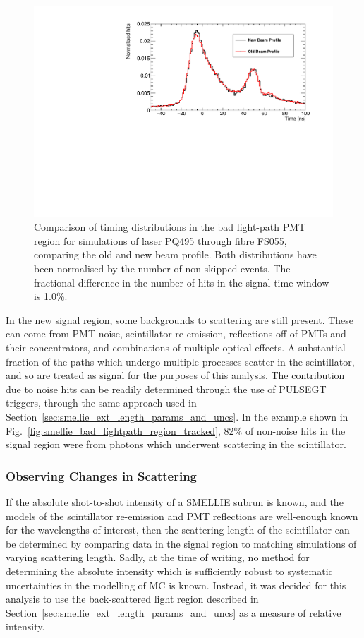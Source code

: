\begin{figure}
    \centering
    \includegraphics[width=\textwidth]{5_SMELLIEAnalysis/images/FS055_PQ495_new_vs_old_beam_profile_bad_lightpath_timeplot.pdf}
    \caption[]
    {Comparison of timing distributions in the bad light-path PMT region for simulations of laser PQ495 through fibre FS055, comparing the old and new beam profile. Both distributions have been normalised by the number of non-skipped events. The fractional difference in the number of hits in the signal time window is 1.0\%.}
    \label{fig:smellie_bad_lightpath_region_beamprofile_comparison}
\end{figure}

In the new signal region, some backgrounds to scattering are still present. These can come from PMT noise, scintillator re-emission, reflections off of PMTs and their concentrators, and combinations of multiple optical effects. A substantial fraction of the paths which undergo multiple processes scatter in the scintillator, and so are treated as signal for the purposes of this analysis. The contribution due to noise hits can be readily determined through the use of PULSEGT triggers, through the same approach used in Section~\ref{sec:smellie_ext_length_params_and_uncs}. In the example shown in Fig.~\ref{fig:smellie_bad_lightpath_region_tracked}, 82\% of non-noise hits in the signal region were from photons which underwent scattering in the scintillator.

\subsubsection{Observing Changes in Scattering}
If the absolute shot-to-shot intensity of a SMELLIE subrun is known, and the models of the scintillator re-emission and PMT reflections are well-enough known for the wavelengths of interest, then the scattering length of the scintillator can be determined by comparing data in the signal region to matching simulations of varying scattering length. Sadly, at the time of writing, no method for determining the absolute intensity which is sufficiently robust to systematic uncertainties in the modelling of MC is known. Instead, it was decided for this analysis to use the back-scattered light region described in Section~\ref{sec:smellie_ext_length_params_and_uncs} as a measure of relative intensity.

